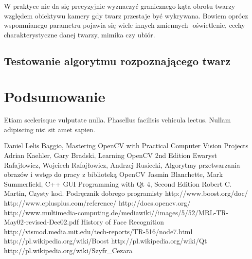 \documentclass[eng,printmode]{mgr}
\begin{document}
W praktyce nie da się precyzyjnie wyznaczyć granicznego kąta obrotu twarzy względem obiektywu kamery gdy twarz przestaje być wykrywana. Bowiem oprócz wspomnianego parametru pojawia się wiele innych zmiennych- oświetlenie, cechy charakterystyczne danej twarzy, mimika czy ubiór.

\section{Testowanie algorytmu rozpoznającego twarz}
\chapter{Podsumowanie}
Etiam scelerisque vulputate nulla. Phasellus facilisis vehicula lectus. Nullam adipiscing nisi sit amet sapien.

\begin{thebibliography}{15}

 Daniel Lelis Baggio, Mastering OpenCV with Practical Computer Vision Projects
 Adrian Kaehler, Gary Bradski, Learning OpenCV 2nd Edition
  Ewaryst Rafajłowicz, Wojciech Rafajłowicz, Andrzej Rusiecki, Algorytmy przetwarzania obrazów i wstęp do pracy z biblioteką OpenCV
 Jasmin Blanchette, Mark Summerfield, C++ GUI Programming with Qt 4, Second Edition
 Robert C. Martin, Czysty kod. Podręcznik dobrego programisty
 http://www.boost.org/doc/
 http://www.cplusplus.com/reference/
 http://docs.opencv.org/
 http://www.multimedia-computing.de/mediawiki//images/5/52/MRL-TR-May02-revised-Dec02.pdf
 History of Face Recognition http://vismod.media.mit.edu/tech-reports/TR-516/node7.html
 http://pl.wikipedia.org/wiki/Boost
 http://pl.wikipedia.org/wiki/Qt
 http://pl.wikipedia.org/wiki/Szyfr\_Cezara
\end{thebibliography}

\end{document}
